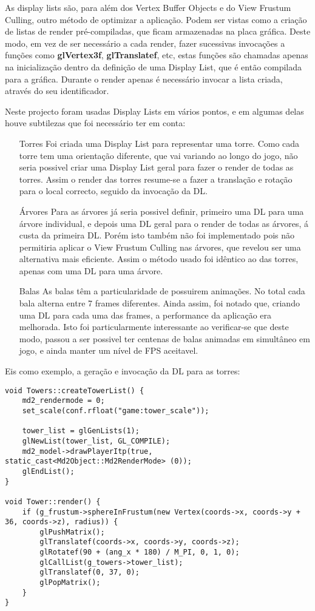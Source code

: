 As display lists são, para além dos Vertex Buffer Objects e do View Frustum Culling, outro método de optimizar a aplicação. Podem ser vistas como a criação de listas de render pré-compiladas, que ficam armazenadas na placa gráfica. Deste modo, em vez de ser necessário a cada render, fazer sucessivas invocações a funções como \textbf{glVertex3f}, \textbf{glTranslatef}, etc, estas funções são chamadas apenas na inicialização dentro da definição de uma Display List, que é então compilada para a gráfica.
Durante o render apenas é necessário invocar a lista criada, através do seu identificador.

Neste projecto foram usadas Display Lists em vários pontos, e em algumas delas houve subtilezas que foi necessário ter em conta:
\begin{itemize}
\item[Torres] Foi criada uma Display List para representar uma torre. Como cada torre tem uma orientação diferente, que vai variando ao longo do jogo, não seria possivel criar uma Display List geral para fazer o render de todas as torres. Assim o render das torres resume-se a fazer a translação e rotação para o local correcto, seguido da invocação da DL.
\item[Árvores] Para as árvores já seria possivel definir, primeiro uma DL para uma árvore individual, e depois uma DL geral para o render de todas as árvores, á custa da primeira DL.
Porém isto também não foi implementado pois não permitiria aplicar o View Frustum Culling nas árvores, que revelou ser uma alternativa mais eficiente. Assim o método usado foi idêntico ao das torres, apenas com uma DL para uma árvore.
\item[Balas] As balas têm a particularidade de possuirem animações. No total cada bala alterna entre 7 frames diferentes. Ainda assim, foi notado que, criando uma DL para cada uma das frames, a performance da aplicação era melhorada. Isto foi particularmente interessante ao verificar-se que deste modo, passou a ser possivel ter centenas de balas animadas em simultâneo em jogo, e ainda manter um nível de FPS aceitavel.
\end{itemize}

Eis como exemplo, a geração e invocação da DL para as torres:

\begin{lstlisting}
void Towers::createTowerList() {
    md2_rendermode = 0;
    set_scale(conf.rfloat("game:tower_scale"));
	
	tower_list = glGenLists(1);
	glNewList(tower_list, GL_COMPILE);
	md2_model->drawPlayerItp(true, static_cast<Md2Object::Md2RenderMode> (0));
	glEndList();
}

void Tower::render() {
    if (g_frustum->sphereInFrustum(new Vertex(coords->x, coords->y + 36, coords->z), radius)) {
        glPushMatrix();
        glTranslatef(coords->x, coords->y, coords->z);
        glRotatef(90 + (ang_x * 180) / M_PI, 0, 1, 0);
        glCallList(g_towers->tower_list);
        glTranslatef(0, 37, 0);
        glPopMatrix();
    }
}
\end{lstlisting}
